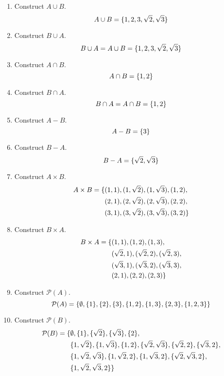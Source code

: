 \documentclass[letterpaper,12pt,fleqn]{article}
\renewcommand{\P}{\mathcal{P}}
\begin{document}
\begin{enumerate}[left=0in]
\item Construct \(A\cup B\).
  \[A\cup B=\{1,2,3,\sqrt{2},\sqrt{3}\}\]
\item Construct \(B\cup A\).
  \[B\cup A=A\cup B=\{1,2,3,\sqrt{2},\sqrt{3}\}\]
\item Construct \(A\cap B\).
  \[A\cap B=\{1,2\}\]
\item Construct \(B\cap A\).
  \[B\cap A=A\cap B=\{1,2\}\]
\item Construct \(A-B\).
  \[A-B=\{3\}\]
\item Construct \(B-A\).
  \[B-A=\{\sqrt{2},\sqrt{3}\}\]
\item Construct \(A\times B\).
  \begin{align*}
    A\times B=\{&(1,1),(1,\sqrt{2}),(1,\sqrt{3}),(1,2), \\
    &(2,1),(2,\sqrt{2}),(2,\sqrt{3}),(2,2), \\
        &(3,1),(3,\sqrt{2}),(3,\sqrt{3}),(3,2)\}
  \end{align*}
\item Construct \(B\times A\).
  \begin{align*}
    B\times A=\{&(1,1),(1,2),(1,3), \\
      &(\sqrt{2},1),(\sqrt{2},2),(\sqrt{2},3), \\
      &(\sqrt{3},1),(\sqrt{3},2),(\sqrt{3},3), \\
      &(2,1),(2,2),(2,3)\}
  \end{align*}
\item Construct \(\P(A)\).
  \[\P(A)=\set{\emptyset,\set{1},\set{2},\set{3},\set{1,2},\set{1,3},\set{2,3},\set{1,2,3}}\]
\item Construct \(\P(B)\).
  \begin{align*}
    \P(B)=\set{&\emptyset,\set{1},\set{\sqrt{2}},\set{\sqrt{3}},\set{2}, \\
      &\set{1,\sqrt{2}},\set{1,\sqrt{3}},\set{1,2},\set{\sqrt{2},\sqrt{3}},\set{\sqrt{2},2},\set{\sqrt{3},2}, \\
      &\set{1,\sqrt{2},\sqrt{3}},\set{1,\sqrt{2},2},\set{1,\sqrt{3},2},\set{\sqrt{2},\sqrt{3},2}, \\
      &\set{1,\sqrt{2},\sqrt{3},2}}
  \end{align*}
\end{enumerate}
\end{document}
